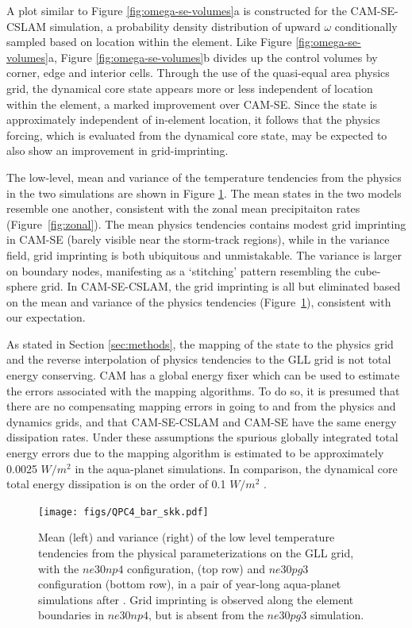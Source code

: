 \documentclass[twocol]{ametsoc}
\begin{document}
A plot similar to Figure \ref{fig:omega-se-volumes}a is constructed for the CAM-SE-CSLAM simulation, a probability density distribution of upward $\omega$ conditionally sampled based on location within the element. {\color{red}Like Figure \ref{fig:omega-se-volumes}a, Figure \ref{fig:omega-se-volumes}b divides up the control volumes by corner, edge and interior cells. Through the use of the quasi-equal area physics grid, the dynamical core state appears more or less independent of location within the element, a marked improvement over CAM-SE. Since the state is approximately independent of in-element location, it follows that the physics forcing, which is evaluated from the dynamical core state, may be expected to also show an improvement in grid-imprinting.{}} 

The low-level, mean and variance of the temperature tendencies from the physics in the two simulations are shown in Figure \ref{fig:tendency_imprint}. {\color{red}The mean states in the two models resemble one another, consistent with the zonal mean precipitaiton rates (Figure~\ref{fig:zonal}).{}} The mean physics tendencies contains modest grid imprinting in CAM-SE (barely visible near the storm-track regions), while in the variance field, grid imprinting is both ubiquitous and unmistakable. The variance is larger on boundary nodes, manifesting as a `stitching' pattern resembling the cube-sphere grid. In CAM-SE-CSLAM, the grid imprinting is all but eliminated based on the mean and variance of the physics tendencies (Figure~\ref{fig:tendency_imprint}), consistent with our expectation.

As stated in Section \ref{sec:methods}, the mapping of the state to the physics grid and the reverse interpolation of physics tendencies to the GLL grid is not total energy conserving. CAM has a global energy fixer \citep{WOHTTV2015JAMES} which can be used to estimate the errors associated with the mapping algorithms. To do so, it is presumed that there are no compensating mapping errors in going to and from the physics and dynamics grids, and that CAM-SE-CSLAM and CAM-SE have the same energy dissipation rates. Under these assumptions the spurious globally integrated total energy errors due to the mapping algorithm is estimated to be approximately 0.0025 $W/m^2$ in the aqua-planet simulations. In comparison, the dynamical core total energy dissipation is on the order of 0.1 $W/m^2$ \citep{LetAl2018JAMES}. 

\begin{figure}[t]
\noindent\texttt{[image: figs/QPC4\_bar\_skk.pdf]}\\
\caption{Mean (left) and variance (right) of the low level temperature tendencies from the physical parameterizations on the GLL grid, with the $ne30np4$ configuration, (top row) and $ne30pg3$ configuration (bottom row), in a pair of year-long aqua-planet simulations after \cite{MWO2016JAMES}. Grid imprinting is observed along the element boundaries in $ne30np4$, but is absent from the $ne30pg3$ simulation.}
\label{fig:tendency_imprint}
\end{figure}
\end{document}
